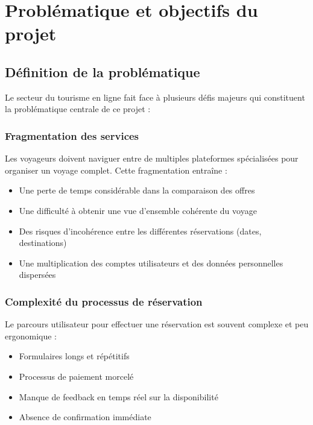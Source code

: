 \documentclass[12pt,a4paper]{report}
\begin{document}
\section{Problématique et objectifs du projet}

\subsection{Définition de la problématique}

Le secteur du tourisme en ligne fait face à plusieurs défis majeurs qui constituent la problématique centrale de ce projet :

\subsubsection{Fragmentation des services}

Les voyageurs doivent naviguer entre de multiples plateformes spécialisées pour organiser un voyage complet. Cette fragmentation entraîne :

\begin{itemize}
    \item Une perte de temps considérable dans la comparaison des offres
    \item Une difficulté à obtenir une vue d'ensemble cohérente du voyage
    \item Des risques d'incohérence entre les différentes réservations (dates, destinations)
    \item Une multiplication des comptes utilisateurs et des données personnelles dispersées
\end{itemize}

\subsubsection{Complexité du processus de réservation}

Le parcours utilisateur pour effectuer une réservation est souvent complexe et peu ergonomique :

\begin{itemize}
    \item Formulaires longs et répétitifs
    \item Processus de paiement morcelé
    \item Manque de feedback en temps réel sur la disponibilité
    \item Absence de confirmation immédiate
\end{itemize}
\end{document}
